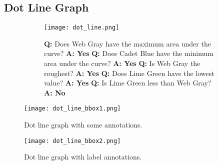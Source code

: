 \documentclass{article} \usepackage{iclr2018_workshop,times}
\begin{document}
\subsection{Dot Line Graph}
\begin{figure}[h]
    \centering
    \caption{Dot line graph with question answer pairs.}
    \label{fig:dotline_qa}
    \begin{subfigure}[]{0.6\textwidth}
        \texttt{[image: dot\_line.png]}
    \end{subfigure}
    \begin{subfigure}[]{0.38\textwidth}
    \textbf{Q:} Does Web Gray have the maximum area under the curve?\newline
    \textbf{A: Yes}\newline\newline
    \textbf{Q:} Does Cadet Blue have the minimum area under the curve?\newline
    \textbf{A: Yes}\newline\newline
    \textbf{Q:} Is Web Gray the roughest?\newline
    \textbf{A: Yes}\newline\newline
    \textbf{Q:} Does Lime Green have the lowest value?\newline
    \textbf{A: Yes}\newline\newline
    \textbf{Q:} Is Lime Green less than Web Gray?\newline
    \textbf{A: No}
    \end{subfigure}
\end{figure}

\begin{SCfigure}[][h]
    \texttt{[image: dot\_line\_bbox1.png]}
    \caption{Dot line graph with some annotations.}
    \label{fig:dotline_anno}
\end{SCfigure}

\begin{SCfigure}[][h]
    \texttt{[image: dot\_line\_bbox2.png]}
    \caption{Dot line graph with label annotations.}
    \label{fig:dotline_anno2}
\end{SCfigure}

\clearpage
\end{document}
